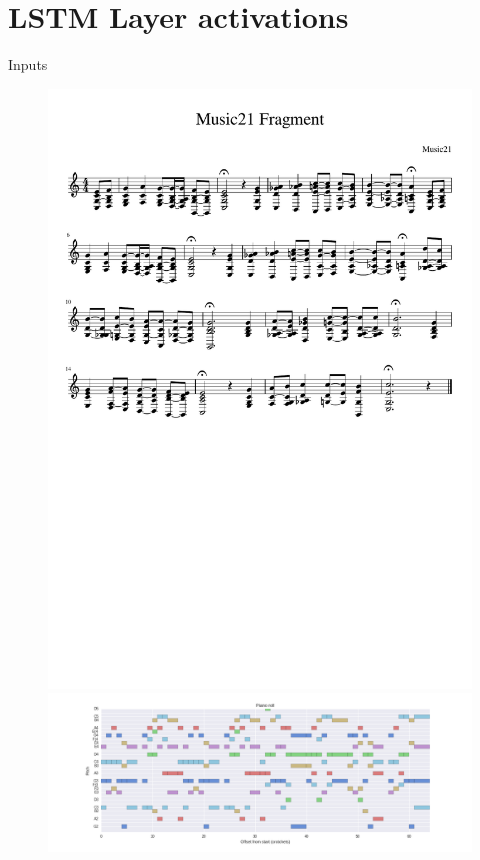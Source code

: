 \documentclass[dissertation.tex]{subfiles}
\begin{document}

\section{LSTM Layer activations}

Inputs

\begin{figure}[htpb]
    \centering
    \includegraphics[trim={0 13cm 0 3.5cm},clip,width=0.95\linewidth]{Figures/model-analysis-input-score.pdf}
    \includegraphics[width=1.0\linewidth]{Figures/model-analysis-input-piano-roll.png}
    \caption{}
    \label{fig:}
\end{figure}
\end{document}
